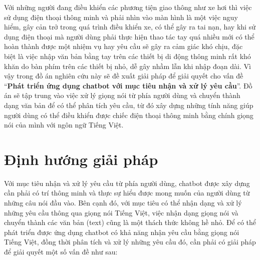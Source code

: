 \documentclass[12pt]{report}
\begin{document}
Với những người đang điều khiển các phương tiện giao thông như xe hơi thì việc sử dụng điện thoại thông minh và phải nhìn vào màn hình là một việc nguy hiểm, gây cản trở trong quá trình điều khiển xe, có thể gây ra tai nạn, hay khi sử dụng điện thoại mà người dùng phải thực hiện thao tác tay quá nhiều mới có thể hoàn thành được một nhiệm vụ hay yêu cầu sẽ gây ra cảm giác khó chịu, đặc biệt là việc nhập văn bản bằng tay trên các thiết bị di động thông minh rất khó khăn do bàn phím trên các thiết bị nhỏ, dễ gây nhầm lẫn khi nhập đoạn dài. Vì vậy trong đồ án nghiên cứu này sẽ đề xuất giải pháp để giải quyết cho vấn đề ``\textbf{Phát triển ứng dụng chatbot với mục tiêu nhận và xử lý yêu cầu}''. Đồ án sẽ tập trung vào việc xử lý giọng nói từ phía người dùng và chuyển thành dạng văn bản để có thể phân tích yêu cầu, từ đó xây dựng những tính năng giúp người dùng có thể điều khiển được chiếc điện thoại thông minh bằng chính giọng nói của mình với ngôn ngữ Tiếng Việt.

\chapter{Định hướng giải pháp}

Với mục tiêu nhận và xử lý yêu cầu từ phía người dùng, chatbot được xây dựng cần phải có trí thông minh và thực sự hiểu được mong muốn của người dùng từ những câu nói đầu vào. Bên cạnh đó, với mục tiêu có thể nhận dạng và xử lý những yêu cầu thông qua giọng nói Tiếng Việt, việc nhận dạng giọng nói và chuyển thành các văn bản (text) cũng là một thách thức không hề nhỏ. Để có thể phát triển được ứng dụng chatbot có khả năng nhận yêu cầu bằng giọng nói Tiếng Việt, đồng thời phân tích và xử lý những yêu cầu đó, cần phải có giải pháp để giải quyết một số vấn đề như sau:
\end{document}
